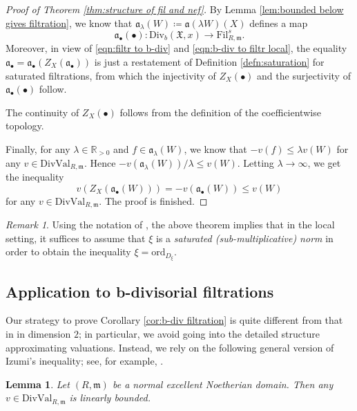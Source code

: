 \documentclass[11pt, leqno]{amsart}%
\theoremstyle{plain}
\newtheorem{lemma}[theorem]{Lemma}
\theoremstyle{definition}
\theoremstyle{remark}
\newtheorem{remark}[theorem]{Remark}
\newcommand{\bR}{\mathbb{R}}
\newcommand{\fX}{\mathfrak{X}}
\newcommand{\fa}{\mathfrak{a}}
\newcommand{\fm}{\mathfrak{m}}
\newcommand{\ord}{\mathrm{ord}}
\newcommand{\DivVal}{\mathrm{DivVal}}
\newcommand{\Div}{\mathrm{Div}}
\newcommand{\Fil}{\mathrm{Fil}}
\begin{document}
    
\begin{proof}[Proof of Theorem \ref{thm:structure of fil and nef}]
    By Lemma \ref{lem:bounded below gives filtration}, we know that $\fa_\lambda(W)\coloneqq\fa(\lambda W)(X)$ defines a map 
    \[
        \fa_\bullet(\bullet):\Div_b(\fX,x)\to \Fil^s_{R,\fm}.
    \]
    Moreover, in view of \eqref{eqn:filtr to b-div} and \eqref{eqn:b-div to filtr local}, the equality $\fa_\bullet=\fa_\bullet(Z_X(\fa_\bullet))$ is just a restatement of Definition \ref{defn:saturation} for saturated filtrations, from which the injectivity of $Z_X(\bullet)$ and the surjectivity of $\fa_\bullet(\bullet)$ follow.

    The continuity of $Z_X(\bullet)$ follows from the definition of the coefficientwise topology.

    Finally, for any $\lambda\in\bR_{>0}$ and $f\in\fa_\lambda(W)$, we know that $-v(f)\le \lambda v(W)$ for any $v\in\DivVal_{R,\fm}$. Hence $-v(\fa_\lambda(W))/\lambda\le v(W)$. 
    Letting $\lambda\to\infty$, we get the inequality 
    \[
        v(Z_X(\fa_\bullet(W)))=-v(\fa_\bullet(W))\le v(W)
    \]
    for any $v\in\DivVal_{R,\fm}$. The proof is finished.
\end{proof}


\begin{remark}\label{rmk:norm}
    Using the notation of \cite{RU-b-div}, the above theorem implies that in the local setting, it suffices to assume that $\xi$ is a \emph{saturated (sub-multiplicative) norm} in order to obtain the inequality $\xi=\ord_{D_\xi}$.
\end{remark}





\subsection{Application to b-divisorial filtrations}

Our strategy to prove Corollary \ref{cor:b-div filtration} is quite different from that in \cite{RU-b-div} in dimension $2$; in particular, we avoid going into the detailed structure approximating valuations. Instead, we rely on the following general version of Izumi's inequality; see, for example, \cite[Remark 1.6]{RS-Izumi}.

\begin{lemma}\label{lem:Izumi}
    Let $(R,\fm)$ be a normal excellent Noetherian domain. Then any $v\in\DivVal_{R,\fm}$ is linearly bounded.
\end{lemma}
\end{document}
